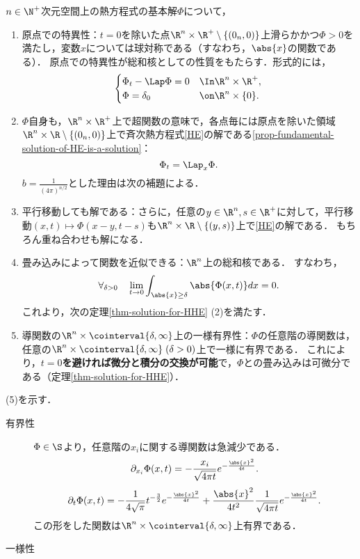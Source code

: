 \documentclass[uplatex,dvipdfmx]{jsreport}
\begin{document}
\begin{proposition}[基本解の性質]\label{prop-property-of-fundamental-solution-to-EH}
    $n\in\N^+$次元空間上の熱方程式の基本解$\Phi$について，
    \begin{enumerate}
        \item 原点での特異性：$t=0$を除いた点$\R^n\times\R^+\setminus\{(0_n,0)\}$上滑らかかつ$\Phi>0$を満たし，変数$x$については球対称である（すなわち，$\abs{x}$の関数である）．
        原点での特異性が総和核としての性質をもたらす．形式的には，
        \[\begin{cases}
            \Phi_t-\Lap\Phi=0&\In\R^n\times\R^+,\\
            \Phi=\delta_0&\on\R^n\times\{0\}.
        \end{cases}\]
        \item $\Phi$自身も，$\R^n\times\R^+$上で超関数の意味で，各点毎には原点を除いた領域$\R^n\times\R\setminus\{(0_n,0)\}$上で斉次熱方程式\ref{HE}の解である\ref{prop-fundamental-solution-of-HE-is-a-solution}：
        \[\Phi_t=\Lap_x\Phi.\]
        $b=\frac{1}{(4\pi)^{n/2}}$とした理由は次の補題による．
        \item 平行移動しても解である：さらに，任意の$y\in\R^n,s\in\R^+$に対して，平行移動$(x,t)\mapsto\Phi(x-y,t-s)$も$\R^n\times\R\setminus\{(y,s)\}$上で\ref{HE}の解である．
        もちろん重ね合わせも解になる．
        \item 畳み込みによって関数を近似できる：$\R^n$上の総和核である．
        すなわち，
        \[\forall_{\delta>0}\quad\lim_{t\to0}\int_{\abs{x}\ge\delta}\abs{\Phi(x,t)}dx=0.\]
        これより，次の定理\ref{thm-solution-for-HHE} (2)を満たす．
        \item 導関数の$\R^n\times\cointerval{\delta,\infty}$上の一様有界性：$\Phi$の任意階の導関数は，任意の$\R^n\times\cointerval{\delta,\infty}\;(\delta>0)$上で一様に有界である．
        これにより，\textbf{$t=0$を避ければ微分と積分の交換が可能}で，$\Phi$との畳み込みは可微分である（定理\ref{thm-solution-for-HHE}）．
    \end{enumerate}
\end{proposition}
\begin{Proof}
    (5)を示す．
    \begin{description}
        \item[有界性] $\Phi\in\S$より，任意階の$x_i$に関する導関数は急減少である．
        \[\partial_{x_i}\Phi(x,t)=-\frac{x_i}{\sqrt{4\pi t}}e^{-\frac{\abs{x}^2}{4t}}.\]
        \[\partial_t\Phi(x,t)=-\frac{1}{4\sqrt{\pi}}t^{-\frac{3}{2}}e^{-\frac{\abs{x}^2}{4t}}+\frac{\abs{x}^2}{4t^2}\frac{1}{\sqrt{4\pi t}}e^{-\frac{\abs{x}^2}{4t}}.\]
        この形をした関数は$\R^n\times\cointerval{\delta,\infty}$上有界である．
        \item[一様性] 
    \end{description}
\end{Proof}
\end{document}
